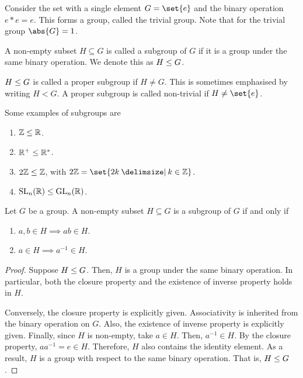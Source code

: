 \documentclass[11pt]{penrose}
\begin{document}
\begin{negg}
    Consider the set with a single element $G = \set{e}$ and the binary operation $e * e = e$. This forms a group, called the trivial group. Note that for the trivial group $\abs{G} = 1$.
\end{negg}

\begin{ndfn}
    A non-empty subset $H \subseteq G$ is called a subgroup of $G$ if it is a group under the same binary operation. We denote this as $H \mathrel{\leq} G$.
\end{ndfn}

\begin{ndfn}
    $H \mathrel{\leq} G$ is called a proper subgroup if $H \neq G$. This is sometimes emphasised by writing $H < G$. A proper subgroup is called non-trivial if $H \neq \set{e}$.
\end{ndfn}

\begin{egg}
    Some examples of subgroups are
    \begin{enumerate}
        \item $\mathbb{Z} \mathrel{\leq} \mathbb{R}$.
        \item $\mathbb{R}^{+} \mathrel{\leq} \mathbb{R}^{*}$.
        \item $2\mathbb{Z} \mathrel{\leq} \mathbb{Z}$, with $2\Z = \set{2k \st k \in \Z}$.
        \item $\mathrm{SL}_{n}(\mathbb{R}) \mathrel{\leq} \mathrm{GL}_{n}(\mathbb{R})$.
    \end{enumerate}
\end{egg}

\begin{nthm}
    Let $G$ be a group. A non-empty subset $H \subseteq G$ is a subgroup of $G$ if and only if
    \begin{enumerate}
        \item $a, b \in H \implies ab \in H$.
        \item $a \in H \implies a^{-1} \in H$.
    \end{enumerate}
\end{nthm}
\begin{proof}
    Suppose $H \mathrel{\leq} G$. Then, $H$ is a group under the same binary operation. In particular, both the closure property and the existence of inverse property holds in $H$.

    Conversely, the closure property is explicitly given. Associativity is inherited from the binary operation on $G$. Also, the existence of inverse property is explicitly given. Finally, since $H$ is non-empty, take $a \in H$. Then, $a^{-1} \in H$. By the closure property, $a a^{-1} = e \in H$. Therefore, $H$ also contains the identity element. As a result, $H$ is a group with respect to the same binary operation. That is, $H \mathrel{\leq} G$.
\end{proof}
\end{document}

